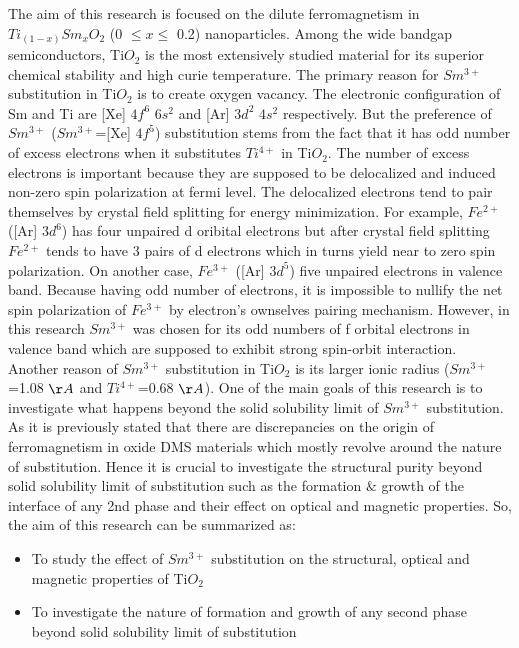 \documentclass[main.tex]{subfiles}
\begin{document}
The aim of this research is focused on the dilute ferromagnetism in $Ti_{(1-x)}Sm_{x}O_{2}$ (0 $\leq x \leq$ 0.2) nanoparticles. Among the wide bandgap semiconductors, Ti$O_{2}$ is the most extensively studied material for its superior chemical stability and high curie temperature. The primary reason for $Sm^{3+}$ substitution in Ti$O_{2}$ is to create oxygen vacancy. The electronic configuration of Sm and Ti are [Xe] $4f^{6}$ $6s^{2}$ and [Ar] $3d^{2}$ $4s^{2}$ respectively. But the preference of $Sm^{3+}$ ($Sm^{3+}$=[Xe] $4f^{5}$) substitution stems from the fact that it has odd number of excess electrons when it substitutes $Ti^{4+}$ in Ti$O_{2}$. The number of excess electrons is important because they are supposed to be delocalized and induced non-zero spin polarization at fermi level. The delocalized electrons tend to pair themselves by crystal field splitting for energy minimization. For example, $Fe^{2+}$ ([Ar] $3d^{6}$) has four unpaired d oribital electrons but after crystal field splitting $Fe^{2+}$ tends to have 3 pairs of d electrons which in turns yield near to zero spin polarization. On another case, $Fe^{3+}$ ([Ar] $3d^{5}$) five unpaired electrons in valence band. Because having odd number of electrons, it is impossible to nullify the net spin polarization of $Fe^{3+}$ by electron's ownselves pairing mechanism. However, in this research $Sm^{3+}$ was chosen for its odd numbers of f orbital electrons in valence band which are supposed to exhibit strong spin-orbit interaction. \\

Another reason of $Sm^{3+}$ substitution in Ti$O_{2}$ is its larger ionic radius ($Sm^{3+}$=1.08 $\AA$ and $Ti^{4+}$=0.68 $\AA$). One of the main goals of this research is to investigate what happens beyond the solid solubility limit of $Sm^{3+}$ substitution. As it is previously stated that there are discrepancies on the origin of ferromagnetism in oxide DMS materials which mostly revolve around the nature of substitution. Hence it is crucial to investigate the structural purity beyond solid solubility limit of substitution such as the formation $\&$ growth of the interface of any 2nd phase and their effect on optical and magnetic properties. So, the aim of this research can be summarized as:

\begin{itemize}
  \item To study the effect of $Sm^{3+}$ substitution on the structural, optical and magnetic properties of Ti$O_{2}$
  \item To investigate the nature of formation and growth of any second phase beyond solid solubility limit of substitution
\end{itemize}
\end{document}
